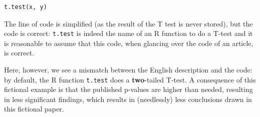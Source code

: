 \begin{verbatim}
t.test(x, y)
\end{verbatim}

The line of code is simplified (as the result of the T test is never stored),
but the code is correct:
\verb|t.test| is indeed the name of an R function to do a T-test
and it is reasonable to assume that this code, when glancing over the code
of an article, is correct.

Here, however, we see a mismatch between the English description and the code:
by default, the R function \verb|t.test| does a \textbf{two}-tailed T-test.
A consequence of this fictional example is that the published p-values are
higher than needed, resulting in less significant findings, which
results in (needlessly) less conclusions drawn in this fictional paper.


